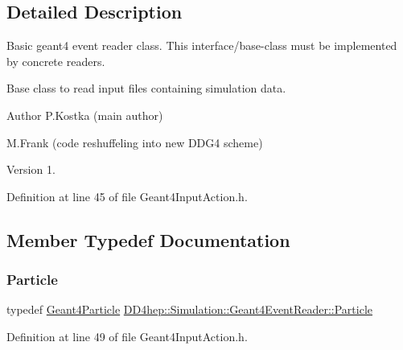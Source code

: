 \subsection{Detailed Description}
Basic geant4 event reader class. This interface/base-\/class must be implemented by concrete readers. 

Base class to read input files containing simulation data.

\begin{DoxyAuthor}{Author}
P.\+Kostka (main author) 

M.\+Frank (code reshuffeling into new D\+D\+G4 scheme) 
\end{DoxyAuthor}
\begin{DoxyVersion}{Version}
1. 
\end{DoxyVersion}


Definition at line 45 of file Geant4\+Input\+Action.\+h.



\subsection{Member Typedef Documentation}
\hypertarget{class_d_d4hep_1_1_simulation_1_1_geant4_event_reader_ad37f7aa722da2299517d66b4568a6a4a}{}\label{class_d_d4hep_1_1_simulation_1_1_geant4_event_reader_ad37f7aa722da2299517d66b4568a6a4a} 
\subsubsection{\texorpdfstring{Particle}{Particle}}
{\footnotesize\ttfamily typedef \hyperlink{class_d_d4hep_1_1_simulation_1_1_geant4_particle}{Geant4\+Particle} \hyperlink{class_d_d4hep_1_1_simulation_1_1_geant4_event_reader_ad37f7aa722da2299517d66b4568a6a4a}{D\+D4hep\+::\+Simulation\+::\+Geant4\+Event\+Reader\+::\+Particle}}



Definition at line 49 of file Geant4\+Input\+Action.\+h.

\hypertarget{class_d_d4hep_1_1_simulation_1_1_geant4_event_reader_afa252e93d319aef2810a17aa78bb4603}{}\label{class_d_d4hep_1_1_simulation_1_1_geant4_event_reader_afa252e93d319aef2810a17aa78bb4603} 
